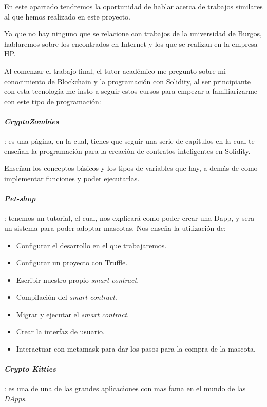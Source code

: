 
En este apartado tendremos la oportunidad de hablar acerca de trabajos similares al que hemos realizado en este proyecto. 

Ya que no hay ninguno que se relacione con trabajos de la universidad de Burgos, hablaremos sobre los encontrados en Internet y los que se realizan en la empresa HP.

Al comenzar el trabajo final, el tutor académico me pregunto sobre mi conocimiento de Blockchain y la programación con Solidity, al ser principiante con esta tecnología me insto a seguir estos cursos para empezar a familiarizarme con este tipo de programación:

\paragraph{\textit{CryptoZombies}}\cite{crypto}: es una página, en la cual, tienes que seguir una serie de capítulos en la cual te enseñan la programación para la creación de contratos inteligentes en Solidity. 

Enseñan los conceptos básicos y los tipos de variables que hay, a demás de como implementar funciones y poder ejecutarlas.


\paragraph{\textit{Pet-shop}}\cite{shop}: tenemos un tutorial, el cual, nos explicará como poder crear una Dapp, y sera un sistema para poder adoptar mascotas. Nos enseña la utilización de:

\begin{itemize}
	\item Configurar el desarrollo en el que trabajaremos.
	\item Configurar un proyecto con Truffle.
	\item Escribir nuestro propio \textit{smart contract}.
	\item Compilación del \textit{smart contract}.
	\item Migrar y ejecutar el \textit{smart contract}.
	\item Crear la interfaz de usuario.
	\item Interactuar con metamask para dar los pasos para la compra de la mascota.
\end{itemize}

\paragraph{\textit{Crypto Kitties}}: es una de una de las grandes aplicaciones con mas fama en el mundo de las \textit{DApps}.

